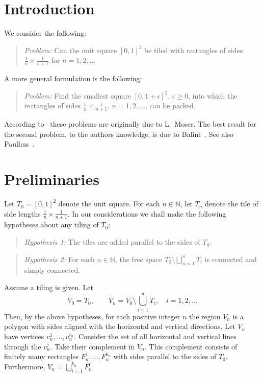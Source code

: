 \documentclass[11pt]{article}
\theoremstyle{plain}%
\theoremstyle{definition}
\theoremstyle{remark}
\numberwithin{equation}{section}
\begin{document}
\newpage

\maketitle

\begin{abstract}
We consider the problem, originally due to L.\ Moser, of tiling the unit square with rectangles of side lengths $\frac{1}{n}\times\frac{1}{n+1}$ for $n=1,2,\ldots$.
This is the result of a University of Toronto Mentoring Program 2015.
\end{abstract}
\section{Introduction}
We consider the following:
\begin{quote}
{\it Problem:}
Can the unit square $[0,1]^2$ be tiled with rectangles of sides $\frac{1}{n}\times\frac{1}{n+1}$ for $n=1,2,\ldots$
\end{quote}
A more general formulation is the following:
\begin{quote}
{\it Problem:}
Find the smallest square $[0,1+\epsilon]^2$, $\epsilon\geq 0$, into which the rectangles of sides $\frac{1}{n}\times\frac{1}{n+1}$, $n=1,2,\ldots$, can be packed.
\end{quote}
According to~\cite[Section D11]{CFG94} these problems are originally due to L.\ Moser.
The best result for the second problem, to the authors knowledge, is due to Balint~\cite{Balint92, Balint98}. See also Paulhus~\cite{Paulhus98}.

\section{Preliminaries}
Let $T_0=[0,1]^2$ denote the unit square.
For each $n\in\mathbb{N}$, let $T_n$ denote the tile of side lengths $\frac{1}{n}\times\frac{1}{n+1}$.
In our considerations we shall make the following hypotheses about any tiling of $T_0$:
\begin{quote}
{\it Hypothesis 1:} 
The tiles are added parallel to the sides of $T_0$.
\end{quote}
\begin{quote}
{\it Hypothesis 2:}
For each $n\in\mathbb{N}$, the free space $T_0\setminus \bigcup_{n=1}^{n}T_i$ is connected and simply connected.
\end{quote}
Assume a tiling is given.
Let 
\begin{equation}
V_0=T_0, \qquad V_n=V_0\setminus \bigcup_{i=1}^{n}T_i, \quad i=1,2,\ldots
\end{equation}
Then, by the above hypotheses, for each positive integer $n$ the region $V_n$ is a polygon with sides aligned with the horizontal and vertical directions.
Let $V_n$ have vertices $v_n^1,\ldots,v_n^{r_n}$.
Consider the set of all horizontal and vertical lines through the $v_n^j$.
Take their complement in $V_n$.
This complement consists of finitely many rectangles $F_n^1,\ldots,F_n^{k_n}$ with sides parallel to the sides of $T_0$.
Furthermore, $V_n=\bigcup_{i=1}^{k_n} F_n^i$.
\end{document}
